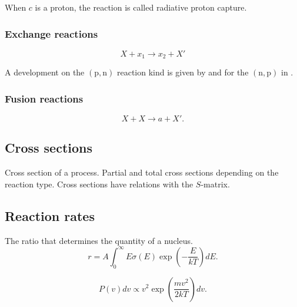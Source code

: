 \documentclass[openany]{book}
\begin{document}
When $c$ is a proton, the reaction is called radiative proton capture. \cite{brune_davids_2015}

\subsubsection{Exchange reactions}  \label{ssub:exchangeReactions}

\begin{equation}  \label{eq:nuclearReaction_exchange}
	X +  x_1 \rightarrow x_2 + X'
\end{equation}

A development on the $\mathrm{(p,n)}$ reaction kind is given by \cite{whitehead_poxon-pearson_nunes_potel_2022} and for the $\mathrm{(n,p)}$ in \cite{sharma_gandhi_kumar_2022}. \\



\subsubsection{Fusion reactions} \label{ssub:fusionReactions}

\begin{equation}  \label{eq:nuclearReaction_fusion}
	X + X \rightarrow a + X'.
\end{equation}

\subsection{Cross sections} \label{sub:crossSections}

Cross section of a process. 
Partial and total cross sections depending on the reaction type.
Cross sections have relations with the $S$-matrix.

\subsection{Reaction rates} \label{sub:reactionRates}

The ratio that determines the quantity of a nucleus.
\begin{equation}  \label{eq:reactionRate_definition}
	r = A \int_0^{\infty} { E \sigma(E) \exp\left({-\frac{E}{kT}}\right)  dE}.
\end{equation}

\begin{equation} \label{eq:maxwellBoltzmann}
	P(v)dv \propto v^2 \exp{\left({\frac{mv^2}{2kT}}\right)}dv.
\end{equation}
\end{document}
